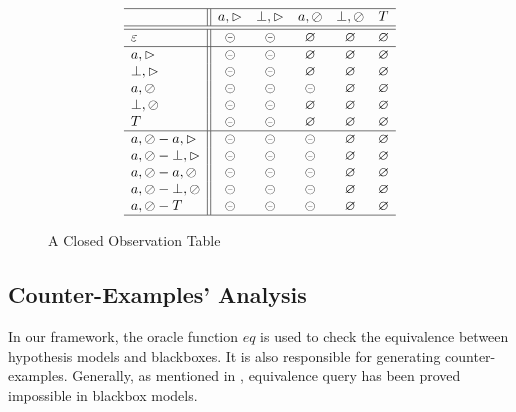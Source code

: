 \documentclass[conference, a4paper]{IEEEtran}
\newcommand{\rblock}[0]{\circleddash}
\newcommand{\rread}[0]{\rhd}
\newcommand{\rnoread}[0]{\oslash}
\newcommand{\rempty}[0]{\varnothing}
\begin{document}
\begin{figure}[ht]
  \begin{center}
    \begin{displaymath}
      \begin{array}{l||ccccc}
        \hline
        & a,\rread & \bot,\rread & a,\rnoread & \bot,\rnoread & T\\
        \hline\hline
        \varepsilon & \rblock & \rblock & \rempty & \rempty & \rempty \\
        \hline
        a,\rread & \rblock & \rblock & \rempty & \rempty & \rempty \\
        \bot,\rread & \rblock & \rblock & \rempty & \rempty & \rempty \\
        a,\rnoread & \rblock & \rblock & \rblock & \rempty & \rempty \\
        \bot,\rnoread & \rblock & \rblock & \rempty & \rempty & \rempty  \\
        T & \rblock & \rblock & \rempty & \rempty & \rempty \\
        \hline
        a,\rnoread-a,\rread & \rblock & \rblock & \rblock & \rempty & \rempty \\
        a,\rnoread-\bot,\rread & \rblock & \rblock & \rblock & \rempty & \rempty \\
        a,\rnoread-a,\rnoread & \rblock & \rblock & \rblock & \rempty & \rempty \\
        a,\rnoread-\bot,\rnoread & \rblock & \rblock & \rblock & \rempty & \rempty \\
        a,\rnoread-T & \rblock & \rblock & \rblock & \rempty & \rempty \\
        \hline
      \end{array}
    \end{displaymath}
  \end{center}
  \caption{A Closed Observation Table}
  \label{fig:hypo2}
\end{figure}

\subsection{Counter-Examples' Analysis} 
In our framework, the oracle function $eq$ is used to check the equivalence between hypothesis
models and blackboxes. It is also responsible for generating counter-examples.
Generally, as mentioned in \cite{DBLP:journals/iandc/Angluin87,DBLP:conf/sfm/SteffenHM11},
equivalence query has been proved impossible in blackbox models.
\end{document}
